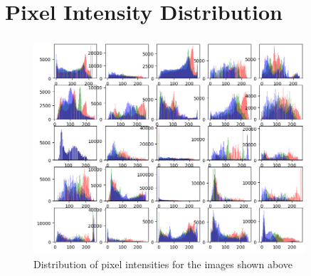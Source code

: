 \section{Pixel Intensity Distribution}

\begin{figure}[h!]
    \centering
    \includegraphics[width=0.9\textwidth, height=8cm]{resources/histo25.jpeg}
    \caption{Distribution of pixel intensities for the images shown above}
  \end{figure}